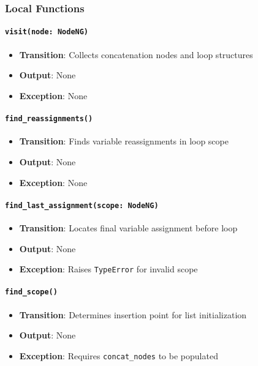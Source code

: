 \documentclass[12pt, titlepage]{article}
\begin{document}
  \subsubsection{Local Functions}
  
  \paragraph{\texttt{visit(node: NodeNG)}}
  \begin{itemize}
  \item \textbf{Transition}: Collects concatenation nodes and loop structures
  \item \textbf{Output}: None
  \item \textbf{Exception}: None
  \end{itemize}
  
  \paragraph{\texttt{find\_reassignments()}}
  \begin{itemize}
  \item \textbf{Transition}: Finds variable reassignments in loop scope
  \item \textbf{Output}: None
  \item \textbf{Exception}: None
  \end{itemize}
  
  \paragraph{\texttt{find\_last\_assignment(scope: NodeNG)}}
  \begin{itemize}
  \item \textbf{Transition}: Locates final variable assignment before loop
  \item \textbf{Output}: None
  \item \textbf{Exception}: Raises \texttt{TypeError} for invalid scope
  \end{itemize}
  
  \paragraph{\texttt{find\_scope()}}
  \begin{itemize}
  \item \textbf{Transition}: Determines insertion point for list initialization
  \item \textbf{Output}: None
  \item \textbf{Exception}: Requires \texttt{concat\_nodes} to be populated
  \end{itemize}
  
\end{document}
